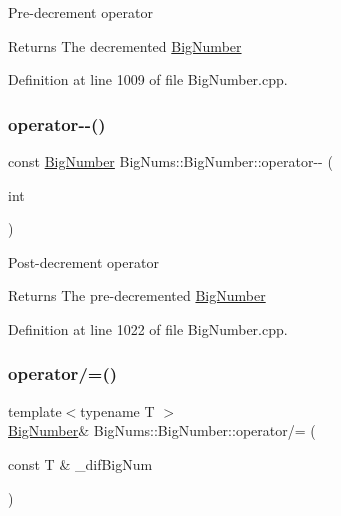 Pre-\/decrement operator \begin{DoxyReturn}{Returns}
The decremented \mbox{\hyperlink{class_big_nums_1_1_big_number}{Big\+Number}} 
\end{DoxyReturn}


Definition at line 1009 of file Big\+Number.\+cpp.

\mbox{\label{class_big_nums_1_1_big_number_ab6475de98159ef5398b22449f5333368}} 
\subsubsection{\texorpdfstring{operator-\/-\/()}{operator--()}\hspace{0.1cm}{\footnotesize\ttfamily [2/2]}}
{\footnotesize\ttfamily const \mbox{\hyperlink{class_big_nums_1_1_big_number}{Big\+Number}} Big\+Nums\+::\+Big\+Number\+::operator-\/-\/ (\begin{DoxyParamCaption}\item[{int}]{ }\end{DoxyParamCaption})}

Post-\/decrement operator \begin{DoxyReturn}{Returns}
The pre-\/decremented \mbox{\hyperlink{class_big_nums_1_1_big_number}{Big\+Number}} 
\end{DoxyReturn}


Definition at line 1022 of file Big\+Number.\+cpp.

\mbox{\label{class_big_nums_1_1_big_number_adff2df5d7288c36d4ab7dfd0b6f5ede4}} 
\subsubsection{\texorpdfstring{operator/=()}{operator/=()}}
{\footnotesize\ttfamily template$<$typename T $>$ \\
\mbox{\hyperlink{class_big_nums_1_1_big_number}{Big\+Number}}\& Big\+Nums\+::\+Big\+Number\+::operator/= (\begin{DoxyParamCaption}\item[{const T \&}]{\+\_\+dif\+Big\+Num }\end{DoxyParamCaption})\hspace{0.3cm}{\ttfamily [inline]}}

